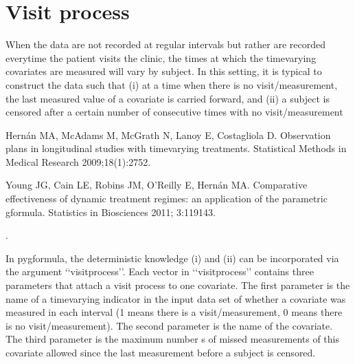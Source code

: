 \documentclass[letterpaper,10pt,english]{sphinxmanual}
\begin{document}
\section{Visit process}
\label{\detokenize{Specifications/Visit process:visit-process}}\label{\detokenize{Specifications/Visit process:id1}}\label{\detokenize{Specifications/Visit process::doc}}
\sphinxAtStartPar
When the data are not recorded at regular intervals but rather are recorded everytime the patient visits the
clinic, the times at which the time\sphinxhyphen{}varying covariates are measured will vary by subject. In this setting,
it is typical to construct the data such that (i) at a time when there is no visit/measurement,
the last measured value of a covariate is carried forward, and (ii) a subject is censored after a certain number of consecutive times
with no visit/measurement \sphinxstepexplicit %
\begin{footnote}[1]\label{\thesphinxscope.1}%
\sphinxAtStartFootnote
Hernán MA, McAdams M, McGrath N, Lanoy E, Costagliola D. Observation plans in longitudinal studies with
time\sphinxhyphen{}varying treatments. Statistical Methods in Medical Research 2009;18(1):27\sphinxhyphen{}52.
%
\end{footnote} \sphinxstepexplicit %
\begin{footnote}[2]\label{\thesphinxscope.2}%
\sphinxAtStartFootnote
Young JG, Cain LE, Robins JM, O’Reilly E, Hernán MA. Comparative effectiveness of dynamic treatment regimes:
an application of the parametric g\sphinxhyphen{}formula. Statistics in Biosciences 2011; 3:119\sphinxhyphen{}143.
%
\end{footnote}.

\sphinxAtStartPar
In pygformula, the deterministic knowledge (i) and (ii) can be incorporated via the argument ‘‘visitprocess’’.
Each vector in ‘‘visitprocess’’ contains three parameters that attach a visit process to one covariate.
The first parameter is the name of a time\sphinxhyphen{}varying indicator in the input data set of whether a covariate was measured in each interval
(1 means there is a visit/measurement, 0 means there is no visit/measurement).
The second parameter is the name of the covariate. The third parameter is the maximum number s of missed measurements of this covariate allowed
since the last measurement before a subject is censored.
\end{document}
